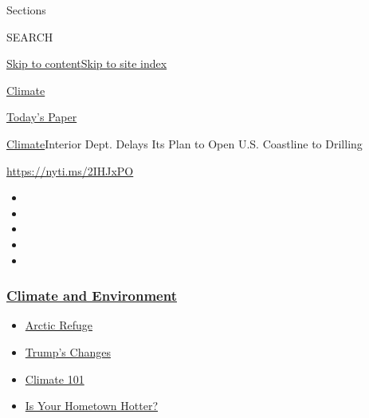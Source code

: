 Sections

SEARCH

\protect\hyperlink{site-content}{Skip to
content}\protect\hyperlink{site-index}{Skip to site index}

\href{https://www.nytimes3xbfgragh.onion/section/climate}{Climate}

\href{https://myaccount.nytimes3xbfgragh.onion/auth/login?response_type=cookie\&client_id=vi}{}

\href{https://www.nytimes3xbfgragh.onion/section/todayspaper}{Today's
Paper}

\href{/section/climate}{Climate}\textbar{}Interior Dept. Delays Its Plan
to Open U.S. Coastline to Drilling

\url{https://nyti.ms/2IHJxPO}

\begin{itemize}
\item
\item
\item
\item
\item
\end{itemize}

\hypertarget{climate-and-environment}{%
\subsubsection{\texorpdfstring{\href{https://www.nytimes3xbfgragh.onion/section/climate?name=styln-climate\&region=TOP_BANNER\&variant=undefined\&block=storyline_menu_recirc\&action=click\&pgtype=Article\&impression_id=a33d6ca0-e397-11ea-a48e-b9252519409f}{Climate
and
Environment}}{Climate and Environment}}\label{climate-and-environment}}

\begin{itemize}
\tightlist
\item
  \href{https://www.nytimes3xbfgragh.onion/2020/08/17/climate/alaska-oil-drilling-anwr.html?name=styln-climate\&region=TOP_BANNER\&variant=undefined\&block=storyline_menu_recirc\&action=click\&pgtype=Article\&impression_id=a33d6ca1-e397-11ea-a48e-b9252519409f}{Arctic
  Refuge}
\item
  \href{https://www.nytimes3xbfgragh.onion/interactive/2020/climate/trump-environment-rollbacks.html?name=styln-climate\&region=TOP_BANNER\&variant=undefined\&block=storyline_menu_recirc\&action=click\&pgtype=Article\&impression_id=a33d93b0-e397-11ea-a48e-b9252519409f}{Trump's
  Changes}
\item
  \href{https://www.nytimes3xbfgragh.onion/interactive/2020/04/19/climate/climate-crash-course-1.html?name=styln-climate\&region=TOP_BANNER\&variant=undefined\&block=storyline_menu_recirc\&action=click\&pgtype=Article\&impression_id=a33d93b1-e397-11ea-a48e-b9252519409f}{Climate
  101}
\item
  \href{https://www.nytimes3xbfgragh.onion/interactive/2018/08/30/climate/how-much-hotter-is-your-hometown.html?name=styln-climate\&region=TOP_BANNER\&variant=undefined\&block=storyline_menu_recirc\&action=click\&pgtype=Article\&impression_id=a33d93b2-e397-11ea-a48e-b9252519409f}{Is
  Your Hometown Hotter?}
\end{itemize}

